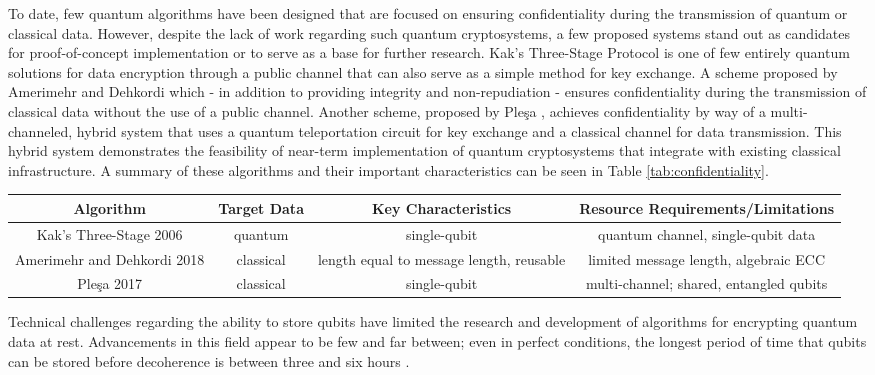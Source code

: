 \documentclass[sigconf]{acmart}
\begin{document}
To date, few quantum algorithms have been designed that are focused on ensuring confidentiality during the transmission of quantum or classical data. However, despite the lack of work regarding such quantum cryptosystems, a few proposed systems stand out as candidates for proof-of-concept implementation or to serve as a base for further research. Kak's Three-Stage Protocol \cite{kak_three-stage_2006} is one of few entirely quantum solutions for data encryption through a public channel that can also serve as a simple method for key exchange. A scheme proposed by Amerimehr and Dehkordi \cite{amerimehr_quantum_2018} which - in addition to providing integrity and non-repudiation - ensures confidentiality during the transmission of classical data without the use of a public channel. Another scheme, proposed by Pleşa \cite{plesa_hybrid_2017}, achieves confidentiality by way of a multi-channeled, hybrid system that uses a quantum teleportation circuit for key exchange and a classical channel for data transmission. This hybrid system demonstrates the feasibility of near-term implementation of quantum cryptosystems that integrate with existing classical infrastructure. A summary of these algorithms and their important characteristics can be seen in Table \ref{tab:confidentiality}.

\begin{table*}[ht]
\caption{Classification of Quantum Confidentiality Algorithms}
\label{tab:confidentiality}
\begin{tabular}{ |c|c|c|c| }
\hline
\textbf{Algorithm} & \textbf{Target Data} & \textbf{Key Characteristics} & \textbf{Resource Requirements/Limitations} \\
\hline
Kak's Three-Stage 2006 & quantum & single-qubit & quantum channel, single-qubit data \\ 
\hline
Amerimehr and Dehkordi 2018 & classical & length equal to message length, reusable & limited message length, algebraic ECC \\ 
\hline
Pleşa 2017 & classical & single-qubit & multi-channel; shared, entangled qubits \\ 
\hline
\end{tabular}
\end{table*}

Technical challenges regarding the ability to store qubits have limited the research and development of algorithms for encrypting quantum data at rest. Advancements in this field appear to be few and far between; even in perfect conditions, the longest period of time that qubits can be stored before decoherence is between three and six hours \cite{saeedi_room-temperature_2013, zhong_optically_2015}.
\end{document}
